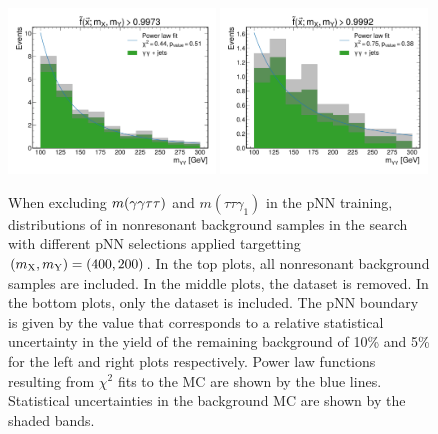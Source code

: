\begin{figure}
    \includegraphics[width=0.49\textwidth]{Figures/Dihiggs/categorisation/mgg_sculpting/y_gg_high_mass/only_diphoton/intermediate_transformed_score_NMSSM_XYH_Y_gg_H_tautau_MX_400_MY_200_frac_uncert_0.05.pdf}
    \includegraphics[width=0.49\textwidth]{Figures/Dihiggs/categorisation/mgg_sculpting/y_gg_high_mass/only_diphoton/intermediate_transformed_score_NMSSM_XYH_Y_gg_H_tautau_MX_400_MY_200_frac_uncert_0.1.pdf}
    \caption[Evidence of No \mgg Sculpting in High-Mass \XYggHtt Search When Excluding $m(\ggtt)$ and $m(\tau\tau\gamma_1)$ as Training Features]{When excluding $m(\ggtt)$ and $m(\tau\tau\gamma_1)$ in the pNN training, distributions of \mgg in nonresonant background samples in the \XYggHtt search with different pNN selections applied targetting $(m_{\mathrm{X}}, m_{\mathrm{Y}}) = (400,200)$\GeV. In the top plots, all nonresonant background samples are included. In the middle plots, the \gjet dataset is removed. In the bottom plots, only the \ggjet dataset is included. The pNN boundary is given by the value that corresponds to a relative statistical uncertainty in the yield of the remaining background of 10\% and 5\% for the left and right plots respectively. Power law functions resulting from $\chi^2$ fits to the MC are shown by the blue lines. Statistical uncertainties in the background MC are shown by the shaded bands.}\label{fig:mgg_sculpting_y_gg_high_mass}
\end{figure}